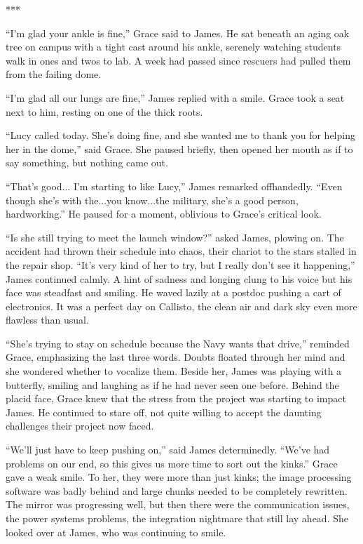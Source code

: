 \documentclass[openany, 12pt]{book} %
\begin{document}
\begin{center}
***
\end{center}

``I'm glad your ankle is fine,'' Grace said to James. He sat beneath an aging oak tree on campus with a tight cast around his ankle, serenely watching students walk in ones and twos to lab. A week had passed since rescuers had pulled them from the failing dome.

``I'm glad all our lungs are fine,'' James replied with a smile. Grace took a seat next to him, resting on one of the thick roots.

``Lucy called today. She's doing fine, and she wanted me to thank you for helping her in the dome,'' said Grace. She paused briefly, then opened her mouth as if to say something, but nothing came out.

``That's good... I'm starting to like Lucy,'' James remarked offhandedly. ``Even though she's with the...you know...the military, she's a good person, hardworking.'' He paused for a moment, oblivious to Grace's critical look. 

``Is she still trying to meet the launch window?'' asked James, plowing on. The accident had thrown their schedule into chaos, their chariot to the stars stalled in the repair shop. ``It's very kind of her to try, but I really don't see it happening,'' James continued calmly. A hint of sadness and longing clung to his voice but his face was steadfast and smiling. He waved lazily at a postdoc pushing a cart of electronics. It was a perfect day on Callisto, the clean air and dark sky even more flawless than usual.

``She's trying to stay on schedule because the Navy wants that drive,'' reminded Grace, emphasizing the last three words. Doubts floated through her mind and she wondered whether to vocalize them. Beside her, James was playing with a butterfly, smiling and laughing as if he had never seen one before. Behind the placid face, Grace knew that the stress from the project was starting to impact James. He continued to stare off, not quite willing to accept the daunting challenges their project now faced.

``We'll just have to keep pushing on,'' said James determinedly. ``We've had problems on our end, so this gives us more time to sort out the kinks.'' Grace gave a weak smile. To her, they were more than just kinks; the image processing software was badly behind and large chunks needed to be completely rewritten. The mirror was progressing well, but then there were the communication issues, the power systems problems, the integration nightmare that still lay ahead. She looked over at James, who was continuing to smile. 
\end{document}
